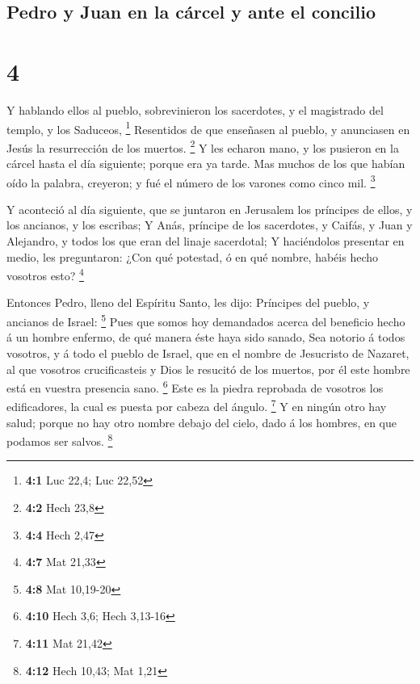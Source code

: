 \hypertarget{pedro-y-juan-en-la-cuxe1rcel-y-ante-el-concilio}{%
\subsection{Pedro y Juan en la cárcel y ante el
concilio}\label{pedro-y-juan-en-la-cuxe1rcel-y-ante-el-concilio}}

\hypertarget{section-3}{%
\section{4}\label{section-3}}

 Y hablando ellos al pueblo, sobrevinieron los sacerdotes, y
el magistrado del templo, y los Saduceos, \footnote{\textbf{4:1} Luc
  22,4; Luc 22,52}  Resentidos de que enseñasen al pueblo, y
anunciasen en Jesús la resurrección de los muertos. \footnote{\textbf{4:2}
  Hech 23,8}  Y les echaron mano, y los pusieron en la
cárcel hasta el día siguiente; porque era ya tarde.  Mas
muchos de los que habían oído la palabra, creyeron; y fué el número de
los varones como cinco mil. \footnote{\textbf{4:4} Hech 2,47}

 Y aconteció al día siguiente, que se juntaron en Jerusalem
los príncipes de ellos, y los ancianos, y los escribas;  Y
Anás, príncipe de los sacerdotes, y Caifás, y Juan y Alejandro, y todos
los que eran del linaje sacerdotal;  Y haciéndolos presentar
en medio, les preguntaron: ¿Con qué potestad, ó en qué nombre, habéis
hecho vosotros esto? \footnote{\textbf{4:7} Mat 21,33}

 Entonces Pedro, lleno del Espíritu Santo, les dijo:
Príncipes del pueblo, y ancianos de Israel: \footnote{\textbf{4:8} Mat
  10,19-20}  Pues que somos hoy demandados acerca del
beneficio hecho á un hombre enfermo, de qué manera éste haya sido
sanado,  Sea notorio á todos vosotros, y á todo el pueblo
de Israel, que en el nombre de Jesucristo de Nazaret, al que vosotros
crucificasteis y Dios le resucitó de los muertos, por él este hombre
está en vuestra presencia sano. \footnote{\textbf{4:10} Hech 3,6; Hech
  3,13-16}  Este es la piedra reprobada de vosotros los
edificadores, la cual es puesta por cabeza del ángulo. \footnote{\textbf{4:11}
  Mat 21,42}  Y en ningún otro hay salud; porque no hay
otro nombre debajo del cielo, dado á los hombres, en que podamos ser
salvos. \footnote{\textbf{4:12} Hech 10,43; Mat 1,21}

